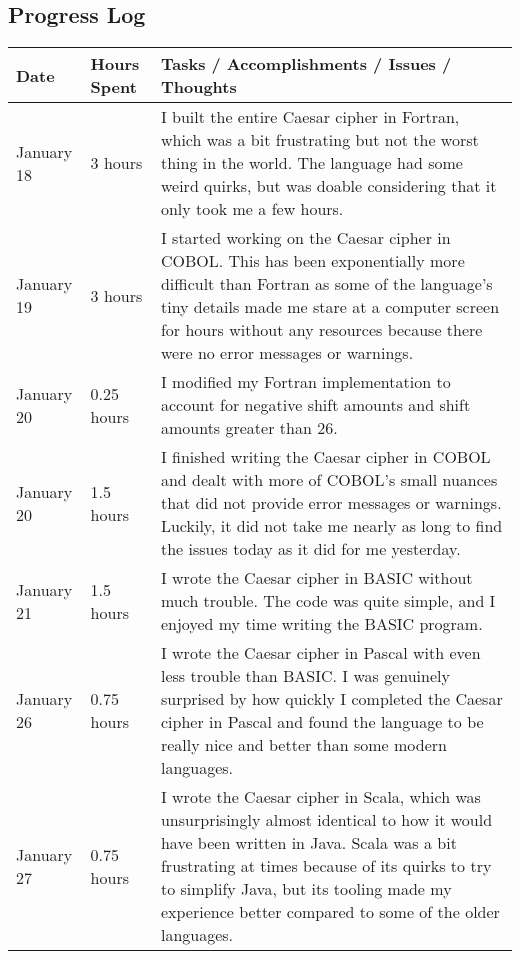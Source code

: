 \documentclass[letterpaper, 10pt, DIV=13]{scrartcl}
\numberwithin{equation}{section}
\numberwithin{figure}{section}
\numberwithin{table}{section}
\begin{document}
\subsection{Progress Log}
\begin{center}
	\begin{longtable}{|p{1in}|p{1in}|p{4in}|}
		\hline
		Date & Hours Spent & Tasks / Accomplishments / Issues / Thoughts
		\\
		\hline
		January 18 & 3 hours & I built the entire Caesar cipher in Fortran, which was a bit frustrating but not the worst thing in the world. The language had some weird quirks, but was doable considering that it only took me a few hours.
		\\
		\hline
		January 19 & 3 hours & I started working on the Caesar cipher in COBOL. This has been exponentially more difficult than Fortran as some of the language's tiny details made me stare at a computer screen for hours without any resources because there were no error messages or warnings.
		\\
		\hline
		January 20 & 0.25 hours & I modified my Fortran implementation to account for negative shift amounts and shift amounts greater than 26. \\
		\hline
		January 20 & 1.5 hours & I finished writing the Caesar cipher in COBOL and dealt with more of COBOL's small nuances that did not provide error messages or warnings. Luckily, it did not take me nearly as long to find the issues today as it did for me yesterday.
		\\
		\hline
		January 21 & 1.5 hours & I wrote the Caesar cipher in BASIC without much trouble. The code was quite simple, and I enjoyed my time writing the BASIC program.
		\\
		\hline
		January 26 & 0.75 hours & I wrote the Caesar cipher in Pascal with even less trouble than BASIC. I was genuinely surprised by how quickly I completed the Caesar cipher in Pascal and found the language to be really nice and better than some modern languages.
		\\
		\hline
		January 27 & 0.75 hours & I wrote the Caesar cipher in Scala, which was unsurprisingly almost identical to how it would have been written in Java. Scala was a bit frustrating at times because of its quirks to try to simplify Java, but its tooling made my experience better compared to some of the older languages.
		\\
		\hline
	\end{longtable}
\end{center}
\end{document}
